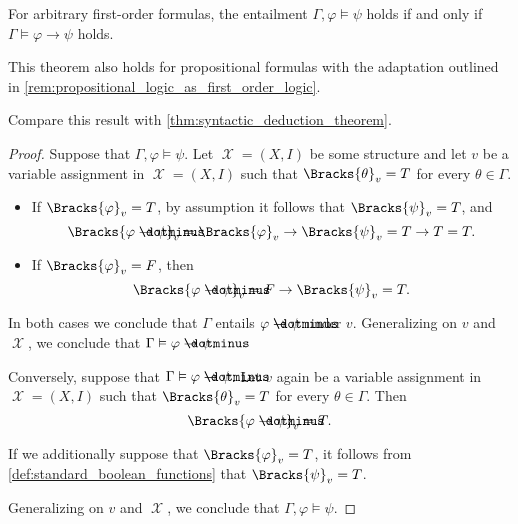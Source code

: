 \begin{theorem}\label{thm:semantic_deduction_theorem}
  For arbitrary first-order formulas, the entailment \( \Gamma, \varphi \vDash \psi \) holds if and only if \( \Gamma \vDash \varphi \to \psi \) holds.
\end{theorem}
\begin{comments}
  \item This theorem also holds for propositional formulas with the adaptation outlined in \cref{rem:propositional_logic_as_first_order_logic}.
  \item Compare this result with \cref{thm:syntactic_deduction_theorem}.
\end{comments}
\begin{proof}
  \SufficiencySubProof Suppose that \( \Gamma, \varphi \vDash \psi \). Let \( \mscrX = (X, I) \) be some structure and let \( v \) be a variable assignment in \( \mscrX = (X, I) \) such that \( \Bracks{\theta}_v = T \) for every \( \theta \in \Gamma \).

  \begin{itemize}
    \item If \( \Bracks{\varphi}_v = T \), by assumption it follows that \( \Bracks{\psi}_v = T \), and
    \begin{equation*}
      \Bracks{\varphi \synimplies \psi}_v
      =
      \Bracks{\varphi}_v \rightarrow \Bracks{\psi}_v
      =
      T \rightarrow T
      =
      T.
    \end{equation*}

    \item If \( \Bracks{\varphi}_v = F \), then
    \begin{equation*}
      \Bracks{\varphi \synimplies \psi}_v
      =
      F \rightarrow \Bracks{\psi}_v
      =
      T.
    \end{equation*}
  \end{itemize}

  In both cases we conclude that \( \Gamma \) entails \( \varphi \synimplies \psi \) under \( v \). Generalizing on \( v \) and \( \mscrX \), we conclude that \( \Gamma \vDash \varphi \synimplies \psi \).

  \NecessitySubProof Conversely, suppose that \( \Gamma \vDash \varphi \synimplies \psi \). Let \( v \) again be a variable assignment in \( \mscrX = (X, I) \) such that \( \Bracks{\theta}_v = T \) for every \( \theta \in \Gamma \). Then
  \begin{equation*}
    \Bracks{\varphi \synimplies \psi}_v = T.
  \end{equation*}

  If we additionally suppose that \( \Bracks{\varphi}_v = T \), it follows from \cref{def:standard_boolean_functions} that \( \Bracks{\psi}_v = T \).

  Generalizing on \( v \) and \( \mscrX \), we conclude that \( \Gamma, \varphi \vDash \psi \).
\end{proof}

